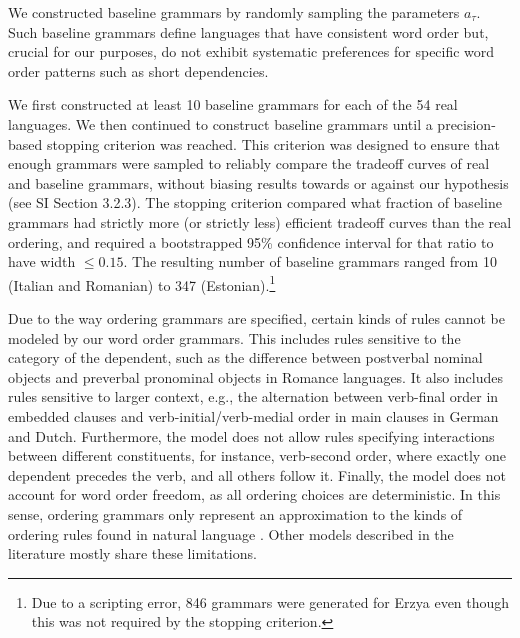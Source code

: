 We constructed baseline grammars by randomly sampling the parameters $a_\tau$.
Such baseline grammars define languages that have consistent word order but, crucial for our purposes, do not exhibit systematic preferences for specific word order patterns such as short dependencies. 

We first constructed at least 10 baseline grammars for each of the 54 real languages.
We then continued to construct baseline grammars until a precision-based stopping criterion was reached. This criterion was designed to ensure that enough grammars were sampled to reliably compare the tradeoff curves of real and baseline grammars, without biasing results towards or against our hypothesis (see SI Section 3.2.3).
The stopping criterion compared what fraction of baseline grammars had strictly more (or strictly less) efficient tradeoff curves than the real ordering, and required a bootstrapped 95\% confidence interval for that ratio to have width $\leq 0.15$.
The resulting number of baseline grammars ranged from 10 (Italian and Romanian) to 347 (Estonian).\footnote{Due to a scripting error, 846 grammars were generated for Erzya even though this was not required by the stopping criterion.}

Due to the way ordering grammars are specified, certain kinds of rules cannot be modeled by our word order grammars.
This includes rules sensitive to the category of the dependent, such as the difference between postverbal nominal objects and preverbal pronominal objects in Romance languages.
It also includes rules sensitive to larger context, e.g., the alternation between verb-final order in embedded clauses and verb-initial/verb-medial order in main clauses in German and Dutch.
Furthermore, the model does not allow rules specifying interactions between different constituents, for instance, verb-second order, where exactly one dependent precedes the verb, and all others follow it.
Finally, the model does not account for word order freedom, as all ordering choices are deterministic.
In this sense, ordering grammars only represent an approximation to the kinds of ordering rules found in natural language \citep{gildea-optimizing-2007, gildea-grammars-2010, gildea-human-2015}.
Other models described in the literature \citep{futrell2015experiments, wang2016galactic} mostly share these limitations.



